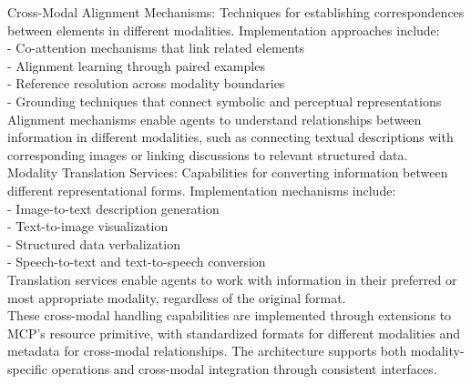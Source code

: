 Cross-Modal Alignment Mechanisms: Techniques for establishing correspondences between elements in different modalities. Implementation approaches include:\\ \newline
- Co-attention mechanisms that link related elements\\ \newline
- Alignment learning through paired examples\\ \newline
- Reference resolution across modality boundaries\\ \newline
- Grounding techniques that connect symbolic and perceptual representations\\ \newline
Alignment mechanisms enable agents to understand relationships between information in different modalities, such as connecting textual descriptions with corresponding images or linking discussions to relevant structured data.\\ \newline
Modality Translation Services: Capabilities for converting information between different representational forms. Implementation mechanisms include:\\ \newline
- Image-to-text description generation\\ \newline
- Text-to-image visualization\\ \newline
- Structured data verbalization\\ \newline
- Speech-to-text and text-to-speech conversion\\ \newline
Translation services enable agents to work with information in their preferred or most appropriate modality, regardless of the original format.\\ \newline
These cross-modal handling capabilities are implemented through extensions to MCP's resource primitive, with standardized formats for different modalities and metadata for cross-modal relationships. The architecture supports both modality-specific operations and cross-modal integration through consistent interfaces.\\
